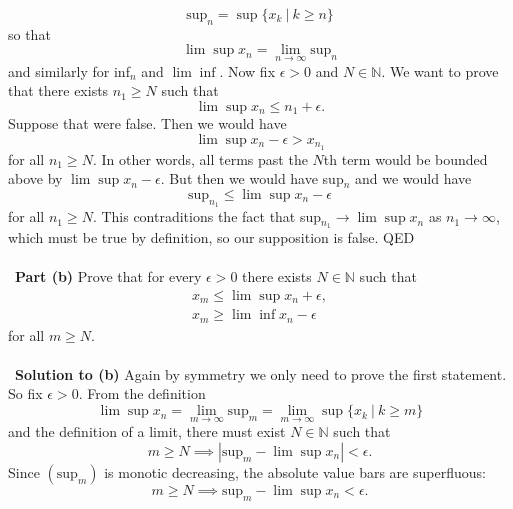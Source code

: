 \documentclass[12 pt]{article}
\newcommand{\N}{\mathbb{N}}
\numberwithin{equation}{section}
\begin{document}
{\begin{equation*}
\mbox{sup} _n = \sup \{ x_k \ | \ k \geq n \}
\end{equation*}
so that \begin{equation*}
\lim \sup x_n = \lim_{n \to \infty} \mbox{sup}_n
\end{equation*}
and similarly for inf$_n$ and $\lim \inf$. Now fix $\epsilon > 0$ and $N \in \N$. We want to prove that there exists $n_1 \geq N$ such that \begin{equation*}
\lim \sup x_n \leq {n_1} + \epsilon.
\end{equation*}
Suppose that were false. Then we would have \begin{equation*}
\lim \sup x_n - \epsilon > x_{n_1}
\end{equation*}
for all $n_1 \geq N$. In other words, all terms past the $N$th term would be bounded above by $\lim \sup x_n - \epsilon$. But then we would have sup$_n$ and we would have \begin{equation*}
\mbox{sup}_{n_1} \leq  \lim \sup x_n - \epsilon
\end{equation*}
for all $n_1 \geq N$. This contraditions the fact that sup$_{n_1} \to \lim \sup x_n$ as $n_1 \to \infty$, which must be true by definition, so our supposition is false. QED\\
\\
\
\textbf{Part (b)} Prove that for every $\epsilon > 0$ there exists $N \in \N$ such that \begin{align*}
x_m \leq \lim \sup x_n + \epsilon, \\
x_m \geq \lim \inf x_n - \epsilon
\end{align*}
for all $m \geq N$.\\
\\
\
\textbf{Solution to (b)} Again by symmetry we only need to prove the first statement. So fix $\epsilon > 0$. From the definition \begin{equation*}
\lim \sup x_n = \lim_{m \to \infty} \mbox{sup}_m = \lim _{m \to \infty} \sup \{ x_k \ | \ k \geq m \}
\end{equation*}
and the definition of a limit, there must exist $N \in \N$ such that \begin{equation*}
m \geq N \implies |\mbox{sup}_m - \lim \sup x_n | < \epsilon.
\end{equation*}
Since $(\mbox{sup}_m)$ is monotic decreasing, the absolute value bars are superfluous: \begin{equation*}
m \geq N \implies \mbox{sup}_m - \lim \sup x_n < \epsilon.
\end{equation*}
}
\end{document}
